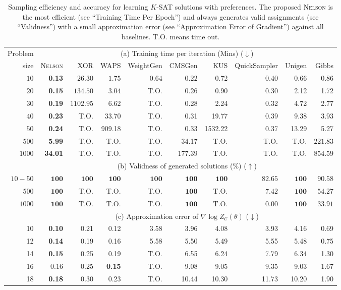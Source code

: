 \documentclass[letterpaper]{article} %
\newcommand{\nls}{\textsc{Nelson}\xspace}
\begin{document}
\begin{table}[!t]
\centering
\begin{tabular}{r|rrrrrrrrr}
\hline
Problem &\multicolumn{9}{c}{{(a) Training time per iteration} (Mins) ($\downarrow$)} \\ \cline{2-10}
size & \nls& XOR & WAPS & WeightGen & CMSGen & KUS &QuickSampler & Unigen & Gibbs\\ \hline
$10$   & \textbf{0.13}  & $26.30$   & $1.75$ & $0.64$     & $0.22$  & 0.72& 0.40 & 0.66  & 0.86 \\
$20$   & \textbf{0.15}  & $134.50$  & $3.04$ & {T.O.}    & 0.26  & 0.90& 0.30 & 2.12  & 1.72 \\
$30$   & \textbf{0.19}  & $1102.95$ & $6.62$ & {T.O.}     & 0.28  & 2.24& 0.32 & 4.72  & 2.77 \\
$40$   & \textbf{0.23}  & T.O.   & 33.70 & {T.O.}    & 0.31  & 19.77 & 0.39 & 9.38  & 3.93 \\
$50$   & \textbf{0.24}  & T.O.   & 909.18& {T.O.}    & 0.33  & 1532.22  & 0.37 & 13.29 & 5.27 \\
$500$  & \textbf{5.99}  & T.O.   & {T.O.} & {T.O.}      & 34.17   & {T.O.} & {T.O.}  & {T.O.}   & $221.83$ \\
$1000$ & \textbf{34.01} & T.O.   & {T.O.} & {T.O.}      & $177.39$    & {T.O.} & {T.O.}  & {T.O.}   & $854.59$\\
\hline
&\multicolumn{9}{c}{(b) Validness of generated solutions ($\%$) ($\uparrow$)} \\ \hline
$10-50$ &  $\mathbf{100}$ & $\mathbf{100}$  &  $\mathbf{100}$  & $\mathbf{100}$  &  $\mathbf{100}$  & $\mathbf{100}$  &  $82.65$ & $\mathbf{100}$  & $90.58$\\
$500$ &   $\mathbf{100}$  & T.O. &  T.O. & T.O. &  $\mathbf{100}$  & T.O. &  $7.42$ & $\mathbf{100}$  & $54.27$\\
$1000$ &   $\mathbf{100}$  & T.O. &  T.O. & T.O. &  $\mathbf{100}$  & T.O. &  $0.00$ & $\mathbf{100}$  & $33.91$\\
\hline
& \multicolumn{9}{c}{(c) Approximation error of  $\nabla\log Z_{\mathcal{C}}(\theta)$ ($\downarrow$)} \\ \hline
10 & \textbf{0.10} & 0.21 & 0.12   & 3.58 & 3.96  & 4.08  & 3.93  & 4.16  & 0.69 \\
12 & \textbf{0.14} & 0.19 & 0.16   & 5.58 & 5.50  & 5.49  & 5.55  & 5.48  & 0.75 \\
14 & \textbf{0.15} & 0.25 & 0.19   & T.O. & 6.55  & 6.24  & 7.79  & 6.34  & 1.30 \\
16 & 0.16   & 0.25 & \textbf{0.15} & T.O. & 9.08  & 9.05  & 9.35  & 9.03  & 1.67 \\
18 & \textbf{0.18} & 0.30 & 0.23   & T.O. & 10.44 & 10.30 & 11.73 & 10.20 & 1.90 \\
\hline
\end{tabular}
\caption{Sampling efficiency and accuracy for learning $K$-SAT solutions with preferences. The proposed \nls is the most efficient (see ``Training Time Per Epoch'') and always generates valid assignments (see ``Validness'') with a small approximation error (see ``Approximation Error of Gradient'') against all baselines. T.O. means time out.}\label{tab:sampler}
\end{table}
\end{document}
